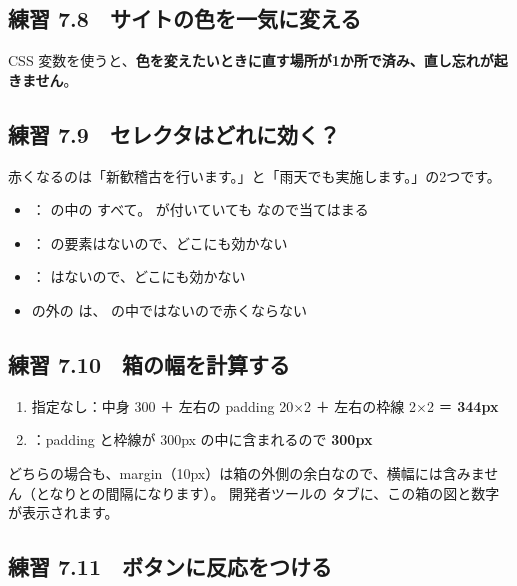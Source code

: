 \subsection*{練習 7.8　サイトの色を一気に変える}
CSS 変数を使うと、\textbf{色を変えたいときに直す場所が1か所で済み、直し忘れが起きません}。

\subsection*{練習 7.9　セレクタはどれに効く？}
赤くなるのは「新歓稽古を行います。」と「雨天でも実施します。」の2つです。
\begin{itemize}
  \item {}： の中の  すべて。 が付いていても  なので当てはまる
  \item {}： の要素はないので、どこにも効かない
  \item {}： はないので、どこにも効かない
  \item {} の外の  は、 の中ではないので赤くならない
\end{itemize}

\subsection*{練習 7.10　箱の幅を計算する}
\begin{enumerate}
  \item 指定なし：中身 300 ＋ 左右の padding 20×2 ＋ 左右の枠線 2×2 ＝ \textbf{344px}
  \item {}：padding と枠線が 300px の中に含まれるので \textbf{300px}
\end{enumerate}
どちらの場合も、margin（10px）は箱の外側の余白なので、横幅には含みません（となりとの間隔になります）。
開発者ツールの  タブに、この箱の図と数字が表示されます。

\subsection*{練習 7.11　ボタンに反応をつける}

